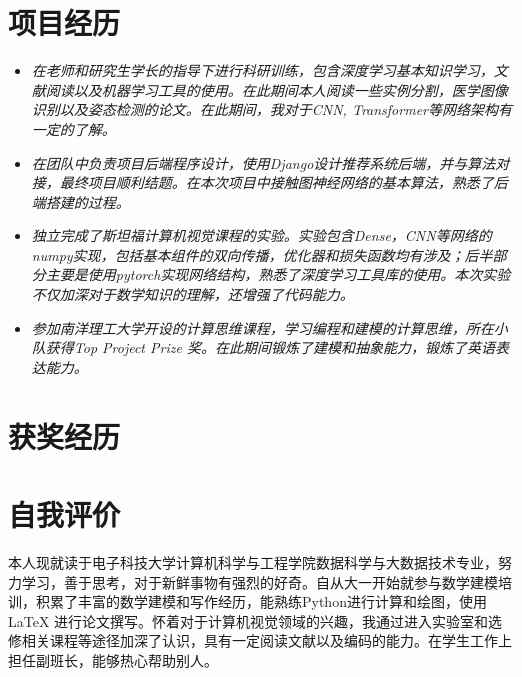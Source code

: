 \documentclass{resume}
\begin{document}
\section{项目经历}

\begin{itemize}
\item \textit{在老师和研究生学长的指导下进行科研训练，包含深度学习基本知识学习，文献阅读以及机器学习工具的使用。在此期间本人阅读一些实例分割，医学图像识别以及姿态检测的论文。在此期间，我对于CNN, Transformer等网络架构有一定的了解。}
\end{itemize}

\begin{itemize}[parsep=0.5ex]
  \item \textit{在团队中负责项目后端程序设计，使用Django设计推荐系统后端，并与算法对接，最终项目顺利结题。在本次项目中接触图神经网络的基本算法，熟悉了后端搭建的过程。}
\end{itemize}

\begin{itemize}[parsep=0.5ex]
  \item \textit{独立完成了斯坦福计算机视觉课程的实验。实验包含Dense，CNN等网络的numpy实现，包括基本组件的双向传播，优化器和损失函数均有涉及；后半部分主要是使用pytorch实现网络结构，熟悉了深度学习工具库的使用。本次实验不仅加深对于数学知识的理解，还增强了代码能力。}
\end{itemize}

\begin{itemize}[parsep=0.5ex]
  \item \textit{参加南洋理工大学开设的计算思维课程，学习编程和建模的计算思维，所在小队获得Top Project Prize 奖。在此期间锻炼了建模和抽象能力，锻炼了英语表达能力。}
\end{itemize}

\section{获奖经历}

\section{自我评价}
本人现就读于电子科技大学计算机科学与工程学院数据科学与大数据技术专业，努力学习，善于思考，对于新鲜事物有强烈的好奇。自从大一开始就参与数学建模培训，积累了丰富的数学建模和写作经历，能熟练Python进行计算和绘图，使用LaTeX 进行论文撰写。怀着对于计算机视觉领域的兴趣，我通过进入实验室和选修相关课程等途径加深了认识，具有一定阅读文献以及编码的能力。在学生工作上担任副班长，能够热心帮助别人。
\end{document}
